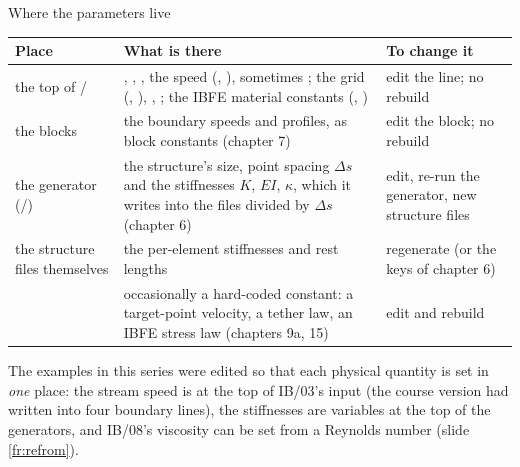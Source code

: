 \documentclass[aspectratio=169,11pt]{beamer}
\begin{document}
\begin{frame}{Where the parameters live}
\label{fr:where}
\scriptsize
\begin{tabular}{@{}L{0.22\textwidth}L{0.42\textwidth}L{0.26\textwidth}@{}}
\toprule
Place & What is there & To change it\\
\midrule
the top of / & , , , the speed (, ), sometimes ; the grid (, ), , ; the IBFE material constants (, ) & edit the line; no rebuild\\
the  blocks & the boundary speeds and profiles, as block constants (chapter 7) & edit the block; no rebuild\\
the generator (/) & the structure's size, point spacing $\Delta s$ and the stiffnesses $K$, $EI$, $\kappa$, which it writes into the files divided by $\Delta s$ (chapter 6) & edit, re-run the generator, new structure files\\
the structure files themselves & the per-element stiffnesses and rest lengths & regenerate (or the  keys of chapter 6)\\
 & occasionally a hard-coded constant: a target-point velocity, a tether law, an IBFE stress law (chapters 9a, 15) & edit and rebuild\\
\bottomrule
\end{tabular}

\vspace{2mm}
\small The examples in this series were edited so that each physical quantity is set in \emph{one} place: the stream speed is  at the top of IB/03's input (the course version had  written into four boundary lines), the stiffnesses are variables at the top of the generators, and IB/08's viscosity can be set from a Reynolds number (slide \ref{fr:refrom}).
\end{frame}
\end{document}

